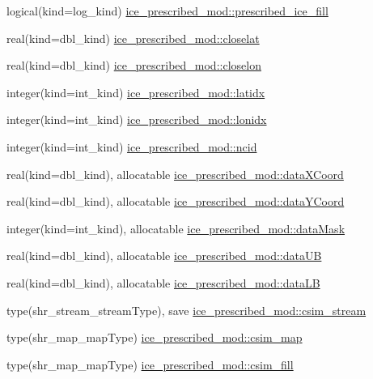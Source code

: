 \begin{DoxyCompactItemize}
\item 
logical(kind=log\_\-kind) \hyperlink{namespaceice__prescribed__mod_aa4a8e7410405429c0277535dff2ec7ea}{ice\_\-prescribed\_\-mod::prescribed\_\-ice\_\-fill}
\item 
real(kind=dbl\_\-kind) \hyperlink{namespaceice__prescribed__mod_ab6b945488fb9a21b8c0abf9c5c9f13d3}{ice\_\-prescribed\_\-mod::closelat}
\item 
real(kind=dbl\_\-kind) \hyperlink{namespaceice__prescribed__mod_a0a932ccb360a743d8d05b685438cce6f}{ice\_\-prescribed\_\-mod::closelon}
\item 
integer(kind=int\_\-kind) \hyperlink{namespaceice__prescribed__mod_a406e46eaa55988c516d70a9e9ed1fb2a}{ice\_\-prescribed\_\-mod::latidx}
\item 
integer(kind=int\_\-kind) \hyperlink{namespaceice__prescribed__mod_a21240c657fdbc312b6cdd4c31395ede0}{ice\_\-prescribed\_\-mod::lonidx}
\item 
integer(kind=int\_\-kind) \hyperlink{namespaceice__prescribed__mod_a2f99c0b35d65529144252c26d4762bc7}{ice\_\-prescribed\_\-mod::ncid}
\item 
real(kind=dbl\_\-kind), allocatable \hyperlink{namespaceice__prescribed__mod_a05759838d18f2fbc703a6ff43bdc217b}{ice\_\-prescribed\_\-mod::dataXCoord}
\item 
real(kind=dbl\_\-kind), allocatable \hyperlink{namespaceice__prescribed__mod_abf3b4ab489983d1531847794139e9397}{ice\_\-prescribed\_\-mod::dataYCoord}
\item 
integer(kind=int\_\-kind), allocatable \hyperlink{namespaceice__prescribed__mod_a4d4897310d6673a94b06d49fd6adfbcc}{ice\_\-prescribed\_\-mod::dataMask}
\item 
real(kind=dbl\_\-kind), allocatable \hyperlink{namespaceice__prescribed__mod_a6cbaf1dd947b14ebfe7fee398952dd6b}{ice\_\-prescribed\_\-mod::dataUB}
\item 
real(kind=dbl\_\-kind), allocatable \hyperlink{namespaceice__prescribed__mod_a74430be62d3958af3edd6b7254027d08}{ice\_\-prescribed\_\-mod::dataLB}
\item 
type(shr\_\-stream\_\-streamType), save \hyperlink{namespaceice__prescribed__mod_ae8eb8307f8c4017094a64d99000f458d}{ice\_\-prescribed\_\-mod::csim\_\-stream}
\item 
type(shr\_\-map\_\-mapType) \hyperlink{namespaceice__prescribed__mod_ada89f7f5c26e2923f8fab5f837979bd9}{ice\_\-prescribed\_\-mod::csim\_\-map}
\item 
type(shr\_\-map\_\-mapType) \hyperlink{namespaceice__prescribed__mod_a9cc059c1adaefc7ef43aa8ccf9f774ea}{ice\_\-prescribed\_\-mod::csim\_\-fill}

\end{DoxyCompactItemize}
